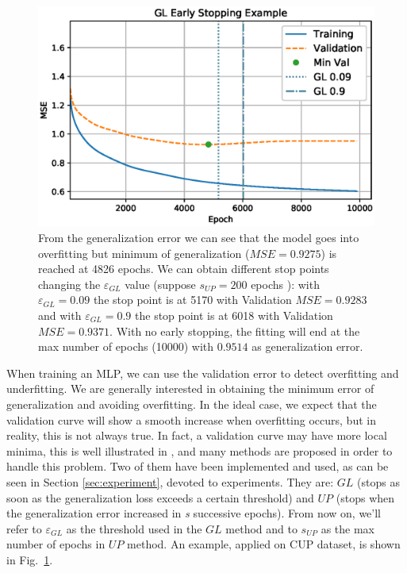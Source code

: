 \documentclass[11pt]{article}
\begin{document}
\begin{figure}[h]
    \centering
    \includegraphics[scale = 0.65]{Images/early_stop.eps}
    \caption{From the generalization error we can see that the model goes into overfitting but minimum of generalization ($MSE = 0.9275$) is reached at 4826 epochs. We can obtain different stop points changing the $\varepsilon_{GL}$ value (suppose $s_{UP}=200$ epochs ): with $\varepsilon_{GL} = 0.09$ the stop point is at 5170 with Validation $MSE = 0.9283$ and with $\varepsilon_{GL} = 0.9$ the stop point is at 6018 with Validation $MSE = 0.9371$. With no early stopping, the fitting will end at the max number of epochs (10000) with $0.9514$ as generalization error.}
    \label{fig:early_stop_example}
\end{figure}
When training an MLP, we can use the validation error to detect overfitting and underfitting. We are generally interested in obtaining the minimum error of generalization and avoiding overfitting. In the ideal case, we expect that the validation curve will show a smooth increase when overfitting occurs, but in reality, this is not always true. In fact, a validation curve may have more local minima, this is well illustrated in \cite{Prechelt2012}, and many methods are proposed in order to handle this problem. Two of them have been implemented and used, as can be seen in Section \ref{sec:experiment}, devoted to experiments. They are: $GL$ (stops as soon as the generalization loss exceeds a certain threshold) and $UP$ (stops when the generalization error increased in \textit{s} successive epochs). From now on, we'll refer to $\varepsilon_{GL}$ as the threshold used in the $GL$ method and to $s_{UP}$ as the max number of epochs in $UP$ method. An example, applied on CUP dataset, is shown in Fig.~\ref{fig:early_stop_example}.
\end{document}
